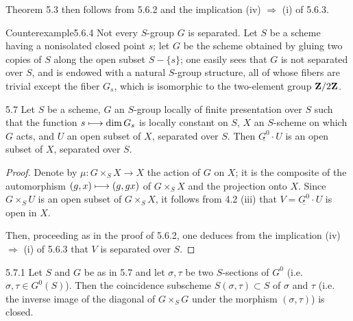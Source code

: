 Theorem 5.3 then follows from 5.6.2 and the implication (iv) $\Rightarrow$ (i) of 5.6.3.
\begin{enoncerm}{Counterexample}{5.6.4}\label{VIB.5.6.4}
Not every $S$-group $G$ is separated. Let $S$ be a scheme having a nonisolated closed point $s$; let $G$ be the scheme obtained by gluing two copies of $S$ along the open subset $S-\{s\}$; one easily sees that $G$ is not separated over $S$, and is endowed with a natural $S$-group structure, all of whose fibers are trivial except the fiber $G_s$, which is isomorphic to the two-element group $\mathbf{Z}/2\mathbf{Z}$.
\end{enoncerm}
\begin{theorem}{5.7}\label{VIB.5.7}
Let $S$ be a scheme, $G$ an $S$-group locally of finite presentation over $S$ such that the function $s\longmapsto\dim G_s$ is locally constant on $S$, $X$ an $S$-scheme on which $G$ acts, and $U$ an open subset of $X$, separated over $S$. Then $\underline{G^0}\cdot U$ is an open subset of $X$, separated over $S$.
\end{theorem}
\begin{proof}
Denote by $\mu:G\times_SX\to X$ the action of $G$ on $X$; it is the composite of the automorphism $(g,x)\longmapsto(g,gx)$ of $G\times_SX$ and the projection onto $X$. Since $G\times_SU$ is an open subset of $G\times_SX$, it follows from 4.2 (iii) that $V=\underline{G^0}\cdot U$ is open in $X$.

Then, proceeding as in the proof of 5.6.2, one deduces from the implication (iv) $\Rightarrow$ (i) of 5.6.3 that $V$ is separated over $S$.
\end{proof}
\begin{corollary}{5.7.1}\label{VIB.5.7.1}
Let $S$ and $G$ be as in 5.7 and let $\sigma,\tau$ be two $S$-sections of $G^0$ (i.e. $\sigma,\tau\in G^0(S)$). Then the coincidence subscheme $S(\sigma,\tau)\subset S$ of $\sigma$ and $\tau$ (i.e. the inverse image of the diagonal of $G\times_SG$ under the morphism $(\sigma,\tau)$) is closed.
\end{corollary}
